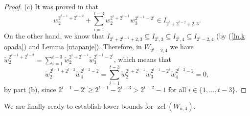 \documentclass{amsart}
\theoremstyle{definition}
\theoremstyle{remark}
\numberwithin{equation}{section}
\newcommand{\w}{\widetilde w}
\newcommand{\zcl}{\operatorname{zcl}}
\renewcommand{\ge}{\geqslant}
\begin{document}
\begin{proof}
    \medskip
    
(c) It was proved in \cite[Corollary 3.8]{CPR} that 
\[w_2^{2^{t-1}+2^{t-2}}+\sum_{i=1}^{t-3}w_2^{2^i+2^{i-1}}w_3^{2^{t-1}-2^i}\in I_{2^t+2^{t-2}+2,3}.\]
On the other hand, we know that $I_{2^t+2^{t-2}+2,3}\subseteq I_{2^t,3}\subseteq I_{2^t,4}\subseteq I_{2^t-2,4}$ (by (\ref{In,k opada}) and Lemma \ref{utapanje}). Therefore, in $W_{2^t-2,4}$ we have $\w_2^{2^{t-1}+2^{t-2}}=\sum_{i=1}^{t-3}\w_2^{2^i+2^{i-1}}\w_3^{2^{t-1}-2^i}$, which means that
\[\w_2^{2^{t-1}+2^{t-2}}\w_4^{2^{t-2}-2}=\sum_{i=1}^{t-3}\w_2^{2^i+2^{i-1}}\w_3^{2^{t-1}-2^i}\w_4^{2^{t-2}-2}=0,\]
by part (b), since $2^{t-1}-2^i\ge2^{t-1}-2^{t-3}>2^{t-2} - 1$ for all $i\in\{1,\ldots,t-3\}$.
\end{proof}

We are finally ready to establish lower bounds for $\zcl(W_{n,4})$.
\end{document}
